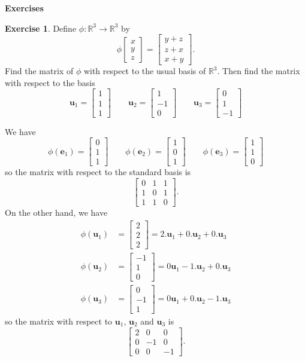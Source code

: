 \documentclass{amsart}
\newcommand{\R}         {{\mathbb{R}}}
\newcommand{\bsm}       {\left[\begin{smallmatrix}}
\newcommand{\esm}       {\end{smallmatrix}\right]}
\newcommand{\ve}        {\mathbf{e}}
\newcommand{\vu}        {\mathbf{u}}
\renewcommand{\:}       {\colon}
\theoremstyle{definition}
\newtheorem{exercise}{Exercise}[section]
\renewenvironment{solution}{\SolutionAtEnd}{\endSolutionAtEnd}
\begin{document}
\begin{center}
 \Large \textbf{Exercises}
\end{center}

\begin{exercise}
 Define $\phi\:\R^3\to\R^3$ by 
 \[ \phi\bsm x\\ y\\ z\esm=\bsm y+z\\ z+x\\ x+y\esm. \]
 Find the matrix of $\phi$ with respect to the usual basis of
 $\R^3$.  Then find the matrix with respect to the basis 
 \[ \vu_1 = \bsm  1\\  1\\  1\esm \hspace{2em}
    \vu_2 = \bsm  1\\ -1\\  0\esm \hspace{2em}
    \vu_3 = \bsm  0\\  1\\ -1\esm
 \]
\end{exercise}
\begin{solution}
 We have
 \[ \phi(\ve_1) = \bsm 0\\1\\1\esm \hspace{2em} 
    \phi(\ve_2) = \bsm 1\\0\\1\esm \hspace{2em}
    \phi(\ve_3) = \bsm 1\\1\\0\esm
 \]
 so the matrix with respect to the standard basis is
 \[ \bsm 0 & 1 & 1 \\ 1 & 0 & 1 \\ 1 & 1 & 0 \esm. \]
 On the other hand, we have
 \begin{align*}
   \phi(\vu_1) &= \bsm 2\\2\\2\esm = 2.\vu_1+0.\vu_2+0.\vu_3 \\
   \phi(\vu_2) &= \bsm -1\\ 1\\ 0\esm = 0\vu_1 - 1.\vu_2 + 0.\vu_3 \\
   \phi(\vu_3) &= \bsm 0\\-1\\ 1\esm = 0\vu_1 + 0.\vu_2 - 1.\vu_3
 \end{align*}
 so the matrix with respect to $\vu_1$, $\vu_2$ and $\vu_3$
 is
 \[ \bsm 2 & 0 & 0 \\ 0 & -1 & 0 \\ 0 & 0 & -1 \esm. \]
\end{solution}
\end{document}
